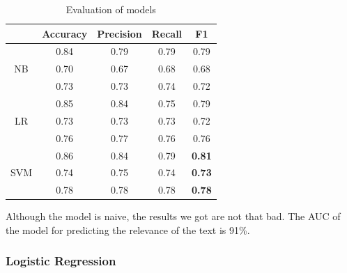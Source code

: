 \documentclass[11pt,a4paper]{article}
\begin{document}
\begin{table}[h]
    \centering
    \begin{tabular}{c | c c c c}
         & Accuracy & Precision & Recall & F1 \\ 
    \hline
    \multirow{3}{*}{NB} & 0.84 & 0.79 & 0.79 & 0.79 \\
                & 0.70 & 0.67 & 0.68 & 0.68 \\
                & 0.73 & 0.73 & 0.74 & 0.72 \\
    \hline
    \multirow{3}{*}{LR} & 0.85 & 0.84 & 0.75 & 0.79 \\
                & 0.73 & 0.73 & 0.73 & 0.72 \\
                & 0.76 & 0.77 & 0.76 & 0.76 \\
    \hline
    \multirow{3}{*}{SVM} & 0.86 & 0.84 & 0.79 & \textbf{0.81} \\
                & 0.74 & 0.75 & 0.74 & \textbf{0.73} \\
                & 0.78 & 0.78 & 0.78 & \textbf{0.78} \\
    
    \end{tabular}
    \caption{Evaluation of models}
    \label{tab:tab1}
\end{table}



Although the model is naive, the results we got are not that bad.
The AUC of the model for predicting the relevance of the text is 91\%.

\subsubsection{Logistic Regression}

\end{document}

